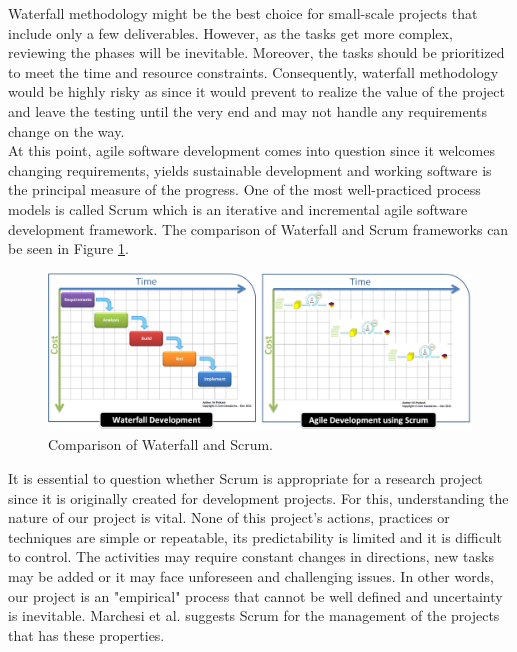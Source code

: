 \documentclass[paper=a4, fontsize=12pt]{scrartcl}	%
\numberwithin{equation}{section}		%
\numberwithin{figure}{section}			%
\numberwithin{table}{section}				%
\begin{document}
Waterfall methodology might be the best choice for small-scale projects that include only a few deliverables. However, as the tasks get more complex, reviewing the phases will be inevitable. Moreover, the tasks should be prioritized to meet the time and resource constraints. Consequently, waterfall methodology would be highly risky as since it would prevent to realize the value of the project and leave the testing until the very end and may not handle any requirements change on the way. \\

At this point, agile software development comes into question since it welcomes changing requirements, yields sustainable development and working software is the principal measure of the progress. One of the most well-practiced process models is called Scrum which is an iterative and incremental agile software development framework. The comparison of Waterfall and Scrum frameworks can be seen in Figure \ref{fig:comparison}.\\


\begin{figure}[h]
\centering
\includegraphics[scale=0.23]{comparision.png}
\caption{Comparison of Waterfall and Scrum.}
\label{fig:comparison}
\end{figure}


It is essential to question whether Scrum is appropriate for a research project since it is originally created for development projects. For this, understanding the nature of our project is vital. None of this project's actions, practices or techniques are simple or repeatable, its predictability is limited and it is difficult to control. The activities may require constant changes in directions, new tasks may be added or it may face unforeseen and challenging issues. In other words, our project is an "empirical" process that cannot be well defined and uncertainty is inevitable. Marchesi et al. suggests Scrum for the management of the projects that has these properties.\\
\end{document}
